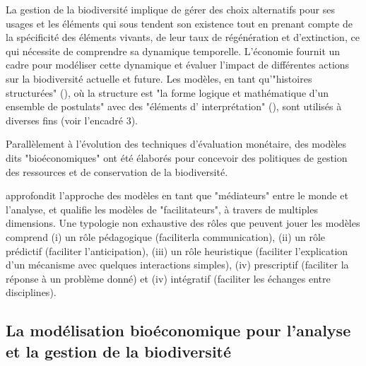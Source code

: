 La gestion de la biodiversité implique de gérer des choix alternatifs pour ses usages et les éléments qui sous tendent son existence tout en prenant compte de la spécificité des éléments vivants, de leur taux de régénération et d'extinction, ce qui nécessite de comprendre sa dynamique temporelle. L'économie fournit un cadre pour modéliser cette dynamique et évaluer l'impact de différentes actions sur la biodiversité actuelle et future. Les modèles, en tant qu'"histoires structurées" (\citep{GibbardVarian}), où la structure est "la forme logique et mathématique d'un ensemble de postulats" avec des "éléments d' interprétation" (\citep{GibbardVarian}), sont utilisés à diverses fins (voir l'encadré 3).

Parallèlement à l'évolution des techniques d'évaluation monétaire, des modèles dits "bioéconomiques" ont été élaborés pour concevoir des politiques de gestion des ressources et de conservation de la biodiversité.

\begin{tcolorbox}[breakable, 
colback=verylightgray, 
colframe=gray!75!black, 
title= {Box 3 - Que font les modèles? },
fontupper=\small]

\cite{varenne_epistemologie_2014} approfondit l'approche des modèles en tant que "médiateurs" entre le monde et l'analyse,  et qualifie les modèles de "facilitateurs", à travers de multiples dimensions. Une typologie non exhaustive des rôles que peuvent jouer les modèles comprend (i) un rôle pédagogique (faciliterla communication), (ii) un rôle prédictif (faciliter l'anticipation), (iii) un rôle heuristique (faciliter l'explication d'un mécanisme avec quelques interactions simples), (iv) prescriptif (faciliter la réponse à un problème donné) et (iv) intégratif (faciliter les échanges entre disciplines). 

\end{tcolorbox}

{}
\subsection*{La modélisation bioéconomique pour l'analyse et la gestion de la biodiversité}

